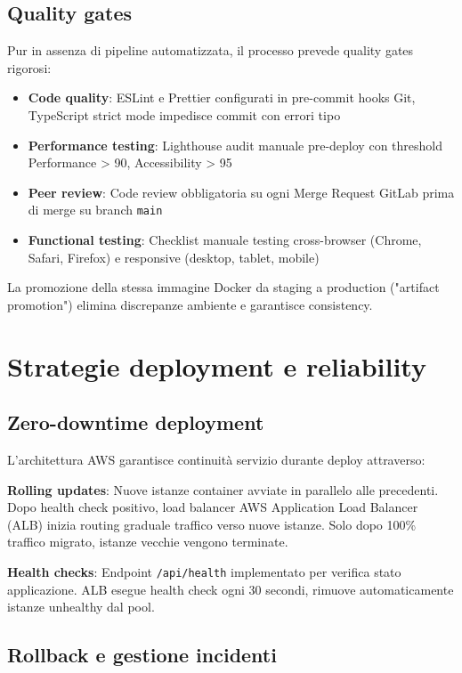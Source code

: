 \subsection{Quality gates}

Pur in assenza di pipeline automatizzata, il processo prevede quality gates rigorosi:

\begin{itemize}
  \item \textbf{Code quality}: ESLint e Prettier configurati in pre-commit hooks Git, TypeScript strict mode impedisce commit con errori tipo
  \item \textbf{Performance testing}: Lighthouse audit manuale pre-deploy con threshold Performance > 90, Accessibility > 95
  \item \textbf{Peer review}: Code review obbligatoria su ogni Merge Request GitLab prima di merge su branch \texttt{main}
  \item \textbf{Functional testing}: Checklist manuale testing cross-browser (Chrome, Safari, Firefox) e responsive (desktop, tablet, mobile)
\end{itemize}

La promozione della stessa immagine Docker da staging a production ("artifact promotion") elimina discrepanze ambiente e garantisce consistency.

\section{Strategie deployment e reliability}

\subsection{Zero-downtime deployment}

L'architettura AWS garantisce continuità servizio durante deploy attraverso:

\textbf{Rolling updates}: Nuove istanze container avviate in parallelo alle precedenti. Dopo health check positivo, load balancer AWS Application Load Balancer (ALB) inizia routing graduale traffico verso nuove istanze. Solo dopo 100\% traffico migrato, istanze vecchie vengono terminate.

\textbf{Health checks}: Endpoint \texttt{/api/health} implementato per verifica stato applicazione. ALB esegue health check ogni 30 secondi, rimuove automaticamente istanze unhealthy dal pool.

\subsection{Rollback e gestione incidenti}

